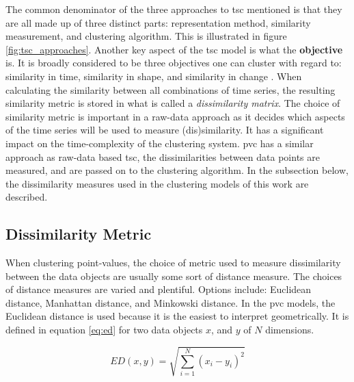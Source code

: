 The common denominator of the three approaches to \acrshort{tsc} mentioned is that they are all made up of three distinct parts: representation method, similarity measurement, and clustering algorithm. This is illustrated in figure \ref{fig:tsc_approaches}. Another key aspect of the \acrshort{tsc} model is what the \textbf{objective} is. It is broadly considered to be three objectives one can cluster with regard to: similarity in time, similarity in shape, and similarity in change \cite{tsc_rev}. When calculating the similarity between all combinations of time series, the resulting similarity metric is stored in what is called a \textit{dissimilarity matrix}. The choice of similarity metric is important in a raw-data approach as it decides which aspects of the time series will be used to measure (dis)similarity. It has a significant impact on the time-complexity of the clustering system. \acrshort{pvc} has a similar approach as raw-data based \acrshort{tsc}, the dissimilarities between data points are measured, and are passed on to the clustering algorithm. In the subsection below, the dissimilarity measures used in the clustering models of this work are described.

\subsection{Dissimilarity Metric} \label{sec:theory_diss}
When clustering point-values, the choice of metric used to measure dissimilarity between the data objects are usually some sort of distance measure. The choices of distance measures are varied and plentiful. Options include: Euclidean distance, Manhattan distance, and Minkowski distance. In the \acrshort{pvc} models, the Euclidean distance is used because it is the easiest to interpret geometrically. It is defined in equation \eqref{eq:ed} for two data objects $x$, and $y$ of $N$ dimensions.

\begin{equation}
    ED(x,y) = \sqrt{\sum_{i = 1}^N (x_i - y_i)^2}
    \label{eq:ed}
\end{equation}

